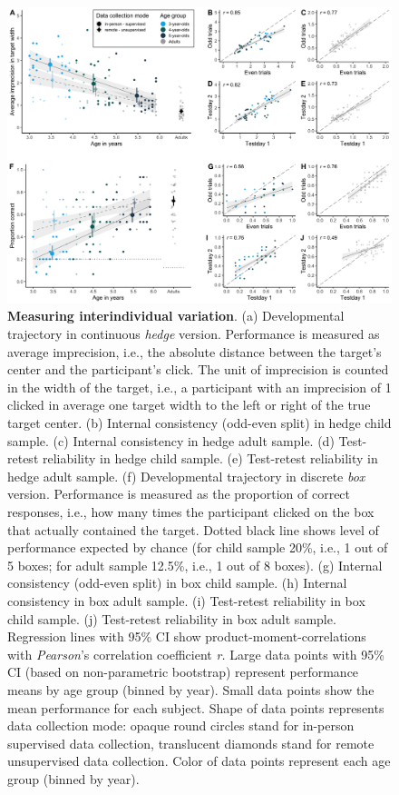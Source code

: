 \documentclass[
  man,floatsintext]{apa6}
\begin{document}
\begin{figure}

{\centering \includegraphics[width=1\linewidth]{../figures/gafo_results} 

}

\caption{\textbf{Measuring interindividual variation}.
(a) Developmental trajectory in continuous \emph{hedge} version. Performance is measured as average imprecision, i.e., the absolute distance between the target's center and the participant's click. The unit of imprecision is counted in the width of the target, i.e., a participant with an imprecision of 1 clicked in average one target width to the left or right of the true target center.
(b) Internal consistency (odd-even split) in hedge child sample. (c) Internal consistency in hedge adult sample. (d) Test-retest reliability in hedge child sample. (e) Test-retest reliability in hedge adult sample.
(f) Developmental trajectory in discrete \emph{box} version. Performance is measured as the proportion of correct responses, i.e., how many times the participant clicked on the box that actually contained the target. Dotted black line shows level of performance expected by chance (for child sample 20\%, i.e., 1 out of 5 boxes; for adult sample 12.5\%, i.e., 1 out of 8 boxes).
(g) Internal consistency (odd-even split) in box child sample. (h) Internal consistency in box adult sample. (i) Test-retest reliability in box child sample. (j) Test-retest reliability in box adult sample.
Regression lines with 95\% CI show product-moment-correlations with \emph{Pearson}'s correlation coefficient \emph{r.}
Large data points with 95\% CI (based on non-parametric bootstrap) represent performance means by age group (binned by year).
Small data points show the mean performance for each subject. Shape of data points represents data collection mode: opaque round circles stand for in-person supervised data collection, translucent diamonds stand for remote unsupervised data collection. Color of data points represent each age group (binned by year).}\label{fig:fig2}
\end{figure}
\end{document}
